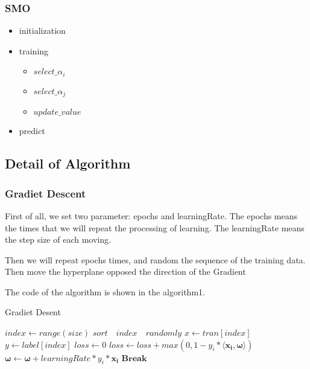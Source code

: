 \documentclass[conference,compsoc]{IEEEtran}
\begin{document}
			\subsubsection{SMO}
				\begin{itemize}
					\item initialization
					\item training
						\begin{itemize}
							\item $select\_\alpha_i$
							\item $select\_\alpha_j$
							\item $update\_value$
						\end{itemize}
					\item predict
				\end{itemize}
	\subsection{Detail of Algorithm}
		\subsubsection{Gradiet Descent}
			First of all, we set two parameter: epochs and learningRate. 
			The epochs means the times that we will repeat the processing of learning.
			The learningRate means the step size of each moving. 

			Then we will repeat epochs times, and random the sequence of the training data.
			Then move the hyperplane opposed the direction of the Gradient

			The code of the algorithm is shown in the algorithm1.

			\begin{algorithm}
				\caption{Gradiet Desent}
				\begin{algorithmic}[1]
							\State $index\gets range(size)$
							\State $sort\quad index\quad randomly$
							\State $x\gets tran[index]$
							\State $y\gets label[index]$
							\State $loss\gets 0$
							\For{$xi,yi\quad in\quad zip(x,y)$}
								\State $loss\gets loss+max(0,1-y_i*\langle \bm{x_i},\bm{\omega}\rangle)$
									\State $\bm{\omega}\gets \bm{\omega}+learningRate*y_i*\bm{x_i}$
								\EndIf
							\EndFor
								\State $\bm{Break}$
							\EndIf
						\EndFor
					\EndFunction
				\end{algorithmic}
			\end{algorithm}
\end{document}
